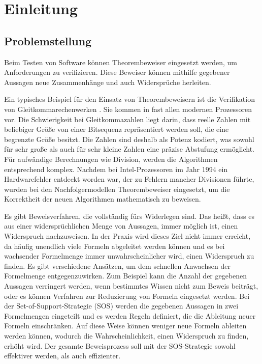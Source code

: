 
\chapter{Einleitung}
\section{Problemstellung}
Beim Testen von Software können Theorembeweiser eingesetzt werden, um Anforderungen zu verifizieren. Diese Beweiser können mithilfe gegebener Aussagen neue Zusammenhänge und auch Widersprüche herleiten.

Ein typisches Beispiel für den Einsatz von Theorembeweisern ist die Verifikation von Gleitkommarechenwerken \cite{Harrison2006Float}. Sie kommen in fast allen modernen Prozessoren vor. Die Schwierigkeit bei Gleitkommazahlen liegt darin, dass reelle Zahlen mit beliebiger Größe von einer Bitsequenz repräsentiert werden soll, die eine begrenzte Größe besitzt. Die Zahlen sind deshalb als Potenz kodiert, was sowohl für sehr große als auch für sehr kleine Zahlen eine präzise Abstufung ermöglicht. Für aufwändige Berechnungen wie Division, werden die Algorithmen entsprechend komplex. Nachdem bei Intel-Prozessoren im Jahr 1994 ein Hardwarefehler entdeckt worden war, der zu Fehlern mancher Divisionen führte, wurden bei den Nachfolgermodellen Theorembeweiser eingesetzt, um die Korrektheit der neuen Algorithmen mathematisch zu beweisen. \cite{WillkommIntel}

Es gibt Beweisverfahren, die vollständig fürs Widerlegen sind. Das heißt, dass es aus einer widersprüchlichen Menge von Aussagen, immer möglich ist, einen Widerspruch nachzuweisen. In der Praxis wird dieses Ziel nicht immer erreicht, da häufig unendlich viele Formeln abgeleitet werden können und es bei wachsender Formelmenge immer unwahrscheinlicher wird, einen Widerspruch zu finden. Es gibt verschiedene Ansätzen, um dem schnellen Anwachsen der Formelmenge entgegenzuwirken. Zum Beispiel kann die Anzahl der gegebenen Aussagen verringert werden, wenn bestimmtes Wissen nicht zum Beweis beiträgt, oder es können Verfahren zur Reduzierung von Formeln eingesetzt werden. Bei der Set-of-Support-Strategie (SOS) werden die gegebenen Aussagen in zwei Formelmengen eingeteilt und es werden Regeln definiert, die die Ableitung neuer Formeln einschränken. Auf diese Weise können weniger neue Formeln ableiten werden können, wodurch die Wahrscheinlichkeit, einen Widerspruch zu finden, erhöht wird. Der gesamte Beweisprozess soll mit der SOS-Strategie sowohl effektiver werden, als auch effizienter.

